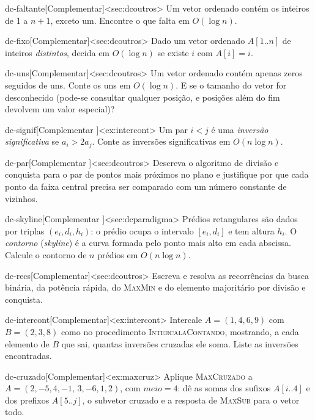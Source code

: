 \begin{exercicio}{dc-faltante}[Complementar]<sec:dcoutros>
Um vetor ordenado contém os inteiros de 1 a $n+1$, exceto um. Encontre o que falta em $O(\log n)$.
\end{exercicio}
\begin{exercicio}{dc-fixo}[Complementar]<sec:dcoutros>
Dado um vetor ordenado $A[1..n]$ de inteiros \emph{distintos}, decida em $O(\log n)$ se existe $i$ com $A[i]=i$.
\end{exercicio}
\begin{exercicio}{dc-uns}[Complementar]<sec:dcoutros>
Um vetor ordenado contém apenas zeros seguidos de uns. Conte os uns em $O(\log n)$. E se o tamanho do vetor for desconhecido (pode-se consultar qualquer posição, e posições além do fim devolvem um valor especial)?
\end{exercicio}
\begin{exercicio}{dc-signif}[Complementar \estrela]<ex:intercont>
Um par $i<j$ é uma \emph{inversão significativa} se $a_i>2a_j$. Conte as inversões significativas em $O(n\log n)$.
\end{exercicio}
\begin{exercicio}{dc-par}[Complementar \estrela]<sec:dcoutros>
Descreva o algoritmo de divisão e conquista para o par de pontos mais próximos no plano e justifique por que cada ponto da faixa central precisa ser comparado com um número constante de vizinhos.
\end{exercicio}
\begin{exercicio}{dc-skyline}[Complementar \estrela]<sec:dcparadigma>
Prédios retangulares são dados por triplas $(e_i,d_i,h_i)$: o prédio ocupa o intervalo $[e_i,d_i]$ e tem altura $h_i$. O \emph{contorno} (\emph{skyline}) é a curva formada pelo ponto mais alto em cada abscissa. Calcule o contorno de $n$ prédios em $O(n\log n)$.
\end{exercicio}
\begin{exercicio}{dc-recs}[Complementar]<sec:dcoutros>
Escreva e resolva as recorrências da busca binária, da potência rápida, do \textsc{MaxMin} e do elemento majoritário por divisão e conquista.
\end{exercicio}
\begin{exercicio}{dc-intercont}[Complementar]<ex:intercont>
Intercale $A=(1,4,6,9)$ com $B=(2,3,8)$ como no procedimento \textsc{IntercalaContando}, mostrando, a cada elemento de $B$ que sai, quantas inversões cruzadas ele soma. Liste as inversões encontradas.
\end{exercicio}
\begin{exercicio}{dc-cruzado}[Complementar]<ex:maxcruz>
Aplique \textsc{MaxCruzado} a $A=(2,-5,4,-1,\,3,-6,1,2)$, com $meio=4$: dê as somas dos sufixos $A[i..4]$ e dos prefixos $A[5..j]$, o subvetor cruzado e a resposta de \textsc{MaxSub} para o vetor todo.
\end{exercicio}
